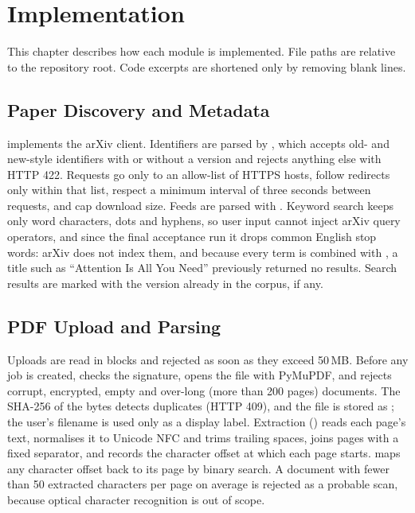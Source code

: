 \chapter{Implementation}\label{ch:implementation}

This chapter describes how each module is implemented. File paths are relative to the repository root. Code
excerpts are shortened only by removing blank lines.

\section{Paper Discovery and Metadata}

 implements the arXiv client. Identifiers are parsed by ,
which accepts old- and new-style identifiers with or without a version and rejects anything else with HTTP 422.
Requests go only to an allow-list of HTTPS hosts, follow redirects only within that list, respect a minimum
interval of three seconds between requests, and cap download size. Feeds are parsed with . Keyword
search keeps only word characters, dots and hyphens, so user input cannot inject arXiv query operators, and since the
final acceptance run it drops common English stop words: arXiv does not index them, and because every term is
combined with , a title such as ``Attention Is All You Need'' previously returned no results. Search
results are marked with the version already in the corpus, if any.

\section{PDF Upload and Parsing}

Uploads are read in blocks and rejected as soon as they exceed 50\,MB. Before any job is created,
 checks the  signature, opens the file with PyMuPDF, and rejects corrupt, encrypted,
empty and over-long (more than 200 pages) documents. The SHA-256 of the bytes detects duplicates (HTTP 409), and the
file is stored as ; the user's filename is used only as a display label. Extraction
() reads each page's text, normalises it to Unicode NFC and trims trailing spaces, joins pages with
a fixed separator, and records the character offset at which each page starts. 
maps any character offset back to its page by binary search. A document with fewer than 50 extracted characters per
page on average is rejected as a probable scan, because optical character recognition is out of scope.

